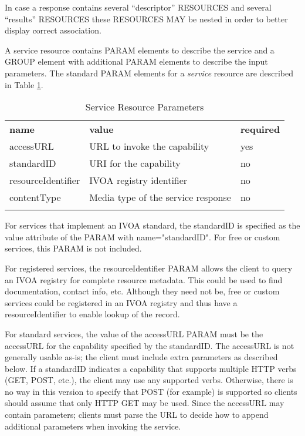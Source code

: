 \documentclass[11pt,a4paper]{ivoa}
\newcommand{\attval}[2]{#1={\allowbreak}{"}#2{"}}
\begin{document}
In case a response contains several ``descriptor'' RESOURCES
and several ``results'' RESOURCES these RESOURCES MAY be nested in
order to better display correct association.

A service resource contains PARAM elements to describe the service and
a GROUP element with additional PARAM elements to describe the input
parameters.
The standard PARAM elements for a {\em service\/} resource
are described in Table \ref{tab:serviceParams}.
\begin{table}[h]
\begin{center}
\begin{tabular}{|l|l|l|}
\sptablerule
{\bf name}  &  {\bf value}  & {\bf required}  \\
\sptablerule
accessURL           & URL to invoke the capability   &  yes  \\
standardID          & URI for the capability         &  no   \\
resourceIdentifier  & IVOA registry identifier       &  no   \\
contentType	    & Media type of the service response & no \\
\sptablerule
\end{tabular}
\end{center}
\caption{Service Resource Parameters}
\label{tab:serviceParams}
\end{table}

For services that implement an IVOA standard, the standardID is specified
as the value attribute of the PARAM with \attval{name}{standardID}.
For free or custom services, this PARAM is not included.

For registered services, the resourceIdentifier PARAM allows the client
to query an IVOA registry for complete resource metadata. This could be
used to find documentation, contact info, etc. Although they need not be,
free or custom services could be registered in an IVOA registry and thus
have a resourceIdentifier to enable lookup of the record.

For standard services, the value of the accessURL PARAM must be the
accessURL for the capability specified by the standardID. The accessURL
is not generally usable as-is; the client must include extra parameters
as described below. If a standardID indicates a capability that supports
multiple HTTP verbs (GET, POST, etc.), the client may use any supported
verbs. Otherwise, there is no way in this version to specify that POST
(for example) is supported so clients should assume that only HTTP GET
may be used. Since the accessURL may contain parameters; clients must
parse the URL to decide how to append additional parameters when
invoking the service.
\end{document}
